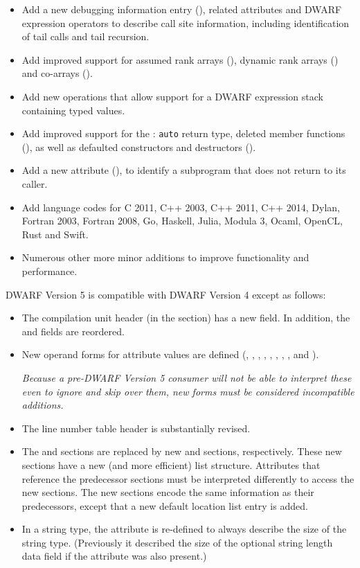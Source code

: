 \begin{itemize}
\item Add a new debugging information entry (\DWTAGcallsiteNAME), related 
attributes and DWARF expression operators to describe call site information, 
including identification of tail calls and tail recursion.
\item Add improved support for  assumed rank arrays 
(\DWTAGgenericsubrangeNAME), dynamic rank arrays (\DWATrankNAME)
and co-arrays (\DWTAGcoarraytypeNAME{}).
\item Add new operations that allow support for 
a DWARF expression stack containing typed values.
\item Add improved support for the :
\texttt{auto} return type, deleted member functions (\DWATdeletedNAME), 
as well as defaulted constructors and destructors (\DWATdefaultedNAME).
\item Add a new attribute (\DWATnoreturnNAME{}), to identify 
a subprogram that does not return to its caller.
\item Add language codes for C 2011, C++ 2003, C++ 2011, C++ 2014,
Dylan, Fortran 2003, Fortran 2008, Go, Haskell, 
Julia, Modula 3, Ocaml, OpenCL, Rust and Swift.
\item Numerous other more minor additions to improve functionality
and performance.
\end{itemize}

DWARF Version 5 is compatible with DWARF Version 4 except as follows:
\begin{itemize}
\item The compilation unit header (in the \dotdebuginfo{} section) has
a new \HFNunittype{} field.
\bb
In addition, the \HFNdebugabbrevoffset{} and \HFNaddresssize{} fields are reordered.
\eb
{}
\item New operand forms for attribute values are defined 
(\DWFORMaddrxNAME, \DWFORMdatasixteenNAME, \DWFORMimplicitconstNAME, 
\DWFORMlinestrpNAME,
\DWFORMloclistxNAME, \DWFORMrnglistxNAME,
\bb
\DWFORMrefsupfourNAME, \DWFORMrefsupeightNAME, 
\eb
\DWFORMstrpsupNAME{} and \DWFORMstrxNAME).

\textit{Because a pre-DWARF Version 5 consumer will not be able to interpret 
these even to ignore and skip over them, new forms must be 
considered incompatible additions.}
\item The line number table header is substantially revised.
\item 
\bb
The \dotdebugloc{} and \dotdebugranges{} sections are replaced
by new \dotdebugloclists{} and \dotdebugrnglists{} sections, respectively.
These new sections have a new (and more efficient) list structure.
Attributes that reference the predecessor sections must be interpreted
differently to access the new sections. The new sections encode the same
information as their predecessors, except that a new default location 
list entry is added. 
\eb
\item In a string type, the \DWATbytesizeNAME{} attribute is re-defined 
to always describe the size of the string type. 
(Previously it described the size of the optional string length data 
field if the \DWATstringlengthNAME{} attribute was also present.)
\end{itemize}

